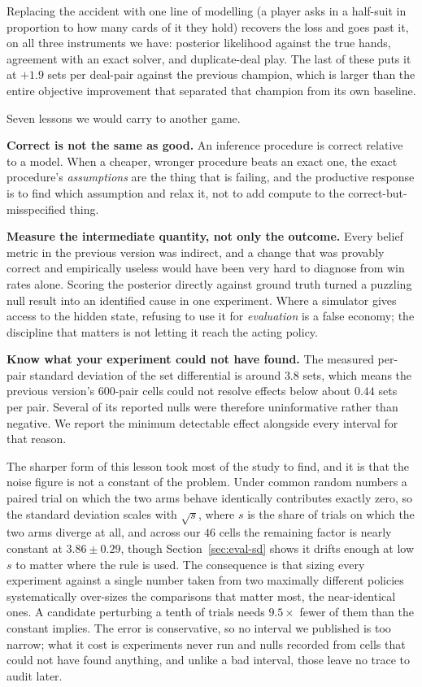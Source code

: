 \documentclass[11pt,letterpaper]{article}
\begin{document}
Replacing the accident with one line of modelling (a player asks in a
half-suit in proportion to how many cards of it they hold) recovers the loss
and goes past it, on all three instruments we have: posterior likelihood against
the true hands, agreement with an exact solver, and duplicate-deal play. The
last of these puts it at $+1.9$ sets per deal-pair against the previous
champion, which is larger than the entire objective improvement that separated
that champion from its own baseline.

Seven lessons we would carry to another game.

\textbf{Correct is not the same as good.} An inference procedure is correct
relative to a model. When a cheaper, wronger procedure beats an exact one, the
exact procedure's \emph{assumptions} are the thing that is failing, and the
productive response is to find which assumption and relax it, not to add
compute to the correct-but-misspecified thing.

\textbf{Measure the intermediate quantity, not only the outcome.} Every belief
metric in the previous version was indirect, and a change that was provably
correct and empirically useless would have been very hard to diagnose from win
rates alone. Scoring the posterior directly against ground truth turned a
puzzling null result into an identified cause in one experiment. Where a
simulator gives access to the hidden state, refusing to use it for
\emph{evaluation} is a false economy; the discipline that matters is not letting
it reach the acting policy.

\textbf{Know what your experiment could not have found.} The measured per-pair
standard deviation of the set differential is around $3.8$ sets, which means the
previous version's 600-pair cells could not resolve effects below about $0.44$
sets per pair. Several of its reported nulls were therefore uninformative rather
than negative. We report the minimum detectable effect alongside every interval
for that reason.

The sharper form of this lesson took most of the study to find, and it is that
the noise figure is not a constant of the problem. Under common random numbers a
paired trial on which the two arms behave identically contributes exactly zero,
so the standard deviation scales with $\sqrt{s}$, where $s$ is the share of
trials on which the two arms diverge at all, and across our $46$ cells the
remaining factor is nearly constant at $3.86 \pm 0.29$, though
Section~\ref{sec:eval-sd} shows it drifts enough at low $s$ to matter where the
rule is used. The consequence is that
sizing every experiment against a single number taken from two maximally
different policies systematically over-sizes the comparisons that matter most,
the near-identical ones. A candidate perturbing a tenth of trials needs
$9.5\times$ fewer of them than the constant implies. The error is conservative,
so no interval we published is too narrow; what it cost is experiments never run
and nulls recorded from cells that could not have found anything, and unlike
a bad interval, those leave no trace to audit later.
\end{document}
